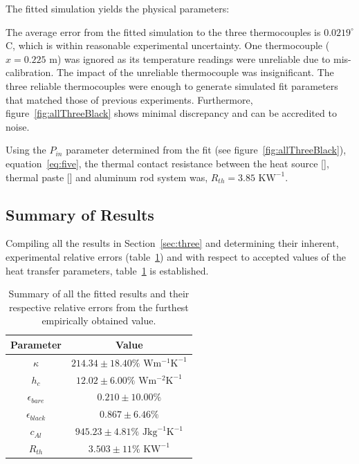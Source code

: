 \documentclass[10pt,aps,prb,twocolumn, nofootinbib]{revtex4-1}
\begin{document}
The fitted simulation yields the physical parameters:
\bigskip
\begin{center}
\end{center}
The average error from the fitted simulation to the three thermocouples is $0.0219 ^\circ$C, which is within reasonable experimental uncertainty. One thermocouple ($x = 0.225 \text{ m}$) was ignored as its temperature readings were unreliable due to mis-calibration. The impact of the unreliable thermocouple was insignificant. The three reliable thermocouples were enough to generate simulated fit parameters that matched those of previous experiments. Furthermore, figure~\ref{fig:allThreeBlack} shows minimal discrepancy and can be accredited to noise.

Using the $P_{in}$ parameter determined from the fit (see figure~\ref{fig:allThreeBlack}), equation~\ref{eq:five}, the thermal contact resistance between the heat source [], thermal paste [] and aluminum rod system was, $\boxed{R_{th} = 3.85 \text{ K}\text{W}^{-1}}$.

\subsection*{Summary of Results}

Compiling all the results in Section~\ref{sec:three} and determining their inherent, experimental relative errors (table~\ref{tab:summResults}) and with respect to accepted values of the heat transfer parameters, table~\ref{tab:summResults} is established.
\begin{table}[hb]
    \caption{\label{tab:summResults}Summary of all the fitted results and their respective relative errors from the furthest empirically obtained value.}
    \centering
    \begin{ruledtabular}
    \begin{tabular}{cc}
    	Parameter & Value\\ \hline
        $\kappa$ & $214.34 \pm 18.40\% \text{ W}\text{m}^{-1}\text{K}^{-1}$\\
        $h_c$ & $12.02 \pm 6.00 \% \text{ W}\text{m}^{-2}\text{K}^{-1}$ \\
        $\epsilon_{bare}$ & $0.210 \pm 10.00\%$ \\
        $\epsilon_{black}$ & $0.867 \pm 6.46\%$\\
        $c_{Al}$ & $945.23 \pm 4.81\% \text{ J}\text{kg}^{-1}\text{K}^{-1}$ \\
        $R_{th}$ & $3.503 \pm 11 \% \text{ K}\text{W}^{-1} $ \\
    \end{tabular}
    \end{ruledtabular}
\end{table}
\end{document}
